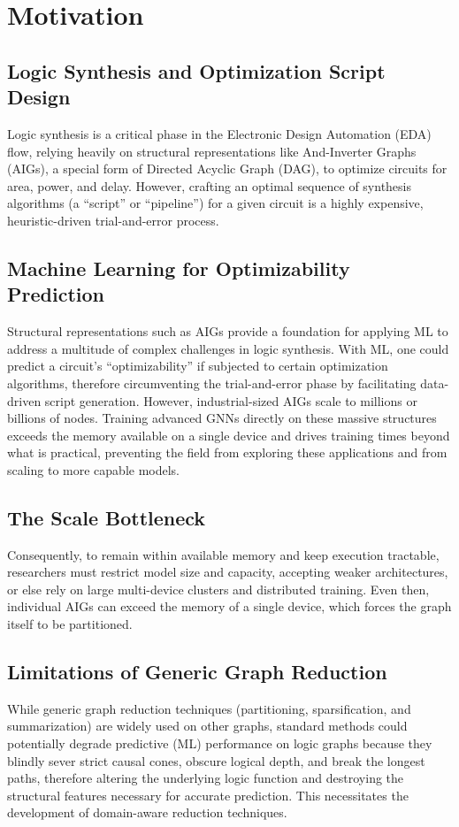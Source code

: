\section{Motivation}
\label{sec:intro:motivation}

\subsection{Logic Synthesis and Optimization Script Design}
\label{sec:intro:motivation:synthesis}
Logic synthesis is a critical phase in the Electronic Design Automation (EDA) flow, relying heavily on structural representations like And-Inverter Graphs (AIGs), a special form of Directed Acyclic Graph (DAG), to optimize circuits for area, power, and delay. However, crafting an optimal sequence of synthesis algorithms (a ``script'' or ``pipeline'') for a given circuit is a highly expensive, heuristic-driven trial-and-error process.

\subsection{Machine Learning for Optimizability Prediction}
\label{sec:intro:motivation:ml}
Structural representations such as AIGs provide a foundation for applying ML to address a multitude of complex challenges in logic synthesis. With ML, one could predict a circuit's ``optimizability'' if subjected to certain optimization algorithms, therefore circumventing the trial-and-error phase by facilitating data-driven script generation. However, industrial-sized AIGs scale to millions or billions of nodes. Training advanced GNNs directly on these massive structures exceeds the memory available on a single device and drives training times beyond what is practical, preventing the field from exploring these applications and from scaling to more capable models.

\subsection{The Scale Bottleneck}
\label{sec:intro:motivation:scale}
Consequently, to remain within available memory and keep execution tractable, researchers must restrict model size and capacity, accepting weaker architectures, or else rely on large multi-device clusters and distributed training. Even then, individual AIGs can exceed the memory of a single device, which forces the graph itself to be partitioned.

\subsection{Limitations of Generic Graph Reduction}
\label{sec:intro:motivation:reduction}
While generic graph reduction techniques (partitioning, sparsification, and summarization) are widely used on other graphs, standard methods could potentially degrade predictive (ML) performance on logic graphs because they blindly sever strict causal cones, obscure logical depth, and break the longest paths, therefore altering the underlying logic function and destroying the structural features necessary for accurate prediction. This necessitates the development of domain-aware reduction techniques.

